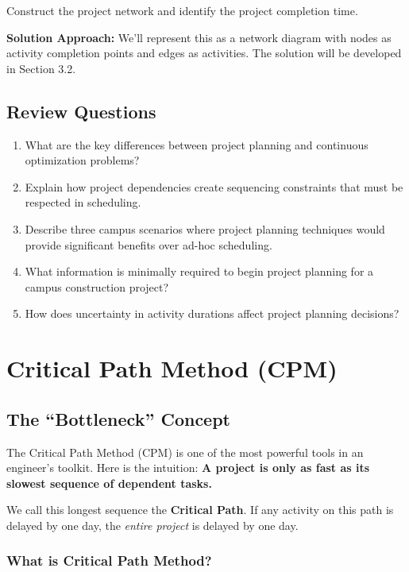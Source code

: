 \documentclass[
  letterpaper,
  DIV=11,
  numbers=noendperiod]{scrreprt}
\begin{document}
Construct the project network and identify the project completion time.

\textbf{Solution Approach:} We'll represent this as a network diagram
with nodes as activity completion points and edges as activities. The
solution will be developed in Section 3.2.

\subsection{Review Questions}\label{review-questions-6}

\begin{enumerate}
\def\labelenumi{\arabic{enumi}.}
\item
  What are the key differences between project planning and continuous
  optimization problems?
\item
  Explain how project dependencies create sequencing constraints that
  must be respected in scheduling.
\item
  Describe three campus scenarios where project planning techniques
  would provide significant benefits over ad-hoc scheduling.
\item
  What information is minimally required to begin project planning for a
  campus construction project?
\item
  How does uncertainty in activity durations affect project planning
  decisions?
\end{enumerate}

\section{Critical Path Method (CPM)}\label{critical-path-method-cpm}

\subsection{The ``Bottleneck'' Concept}\label{the-bottleneck-concept}

The Critical Path Method (CPM) is one of the most powerful tools in an
engineer's toolkit. Here is the intuition: \textbf{A project is only as
fast as its slowest sequence of dependent tasks.}

We call this longest sequence the \textbf{Critical Path}. If any
activity on this path is delayed by one day, the \emph{entire project}
is delayed by one day.

\subsubsection{What is Critical Path
Method?}\label{what-is-critical-path-method}
\end{document}
